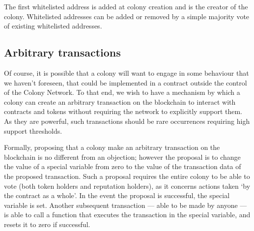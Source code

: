 The first whitelisted address is added at colony creation and is the creator of the colony. Whitelisted addresses can be added or removed by a simple majority vote of existing whitelisted addresses.

\subsection{Arbitrary transactions}\label{sec:arbitrary-transaction}

Of course, it is possible that a colony will want to engage in some behaviour that we haven't foreseen, that could be implemented in a contract outside the control of the Colony Network. To that end, we wish to have a mechanism by which a colony can create an arbitrary transaction on the blockchain to interact with contracts and tokens without requiring the network to explicitly support them. As they are powerful, such transactions should be rare occurrences requiring high support thresholds.

Formally, proposing that a colony make an arbitrary transaction on the blockchain is no different from an objection; however the proposal is to change the value of a special variable from zero to the value of the transaction data of the proposed transaction. Such a proposal requires the entire colony to be able to vote (both token holders and reputation holders), as it concerns actions taken `by the contract as a whole'. In the event the proposal is successful, the special variable is set. Another subsequent transaction --- able to be made by anyone --- is able to call a function that executes the transaction in the special variable, and resets it to zero if successful.
